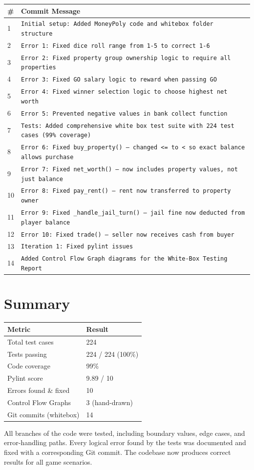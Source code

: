 \documentclass[12pt,a4paper]{article}
\begin{document}
\begin{longtable}{p{1cm} p{11cm}}
\toprule
\textbf{\#} & \textbf{Commit Message} \\
\midrule
1 & \texttt{Initial setup: Added MoneyPoly code and whitebox folder structure} \\
2 & \texttt{Error 1: Fixed dice roll range from 1-5 to correct 1-6} \\
3 & \texttt{Error 2: Fixed property group ownership logic to require all properties} \\
4 & \texttt{Error 3: Fixed GO salary logic to reward when passing GO} \\
5 & \texttt{Error 4: Fixed winner selection logic to choose highest net worth} \\
6 & \texttt{Error 5: Prevented negative values in bank collect function} \\
7 & \texttt{Tests: Added comprehensive white box test suite with 224 test cases (99\% coverage)} \\
8 & \texttt{Error 6: Fixed buy\_property() --- changed <= to < so exact balance allows purchase} \\
9 & \texttt{Error 7: Fixed net\_worth() --- now includes property values, not just balance} \\
10 & \texttt{Error 8: Fixed pay\_rent() --- rent now transferred to property owner} \\
11 & \texttt{Error 9: Fixed \_handle\_jail\_turn() --- jail fine now deducted from player balance} \\
12 & \texttt{Error 10: Fixed trade() --- seller now receives cash from buyer} \\
13 & \texttt{Iteration 1: Fixed pylint issues} \\
14 & \texttt{Added Control Flow Graph diagrams for the White-Box Testing Report} \\
\bottomrule
\end{longtable}

\section{Summary}

\begin{center}
\begin{tabular}{ll}
\toprule
\textbf{Metric} & \textbf{Result} \\
\midrule
Total test cases & 224 \\
Tests passing & 224 / 224 (100\%) \\
Code coverage & 99\% \\
Pylint score & 9.89 / 10 \\
Errors found \& fixed & 10 \\
Control Flow Graphs & 3 (hand-drawn) \\
Git commits (whitebox) & 14 \\
\bottomrule
\end{tabular}
\end{center}

All branches of the code were tested, including boundary values, edge cases, and error-handling paths. Every logical error found by the tests was documented and fixed with a corresponding Git commit. The codebase now produces correct results for all game scenarios.
\end{document}

